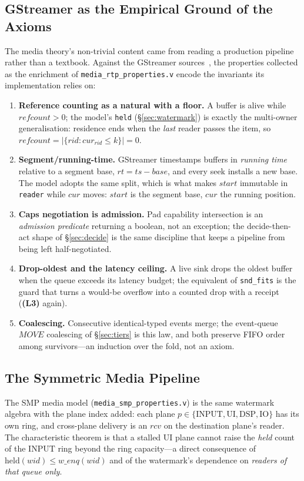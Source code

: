 \documentclass[10pt,journal,compsoc,twocolumn]{article}
\theoremstyle{definition}
\theoremstyle{remark}
\theoremstyle{plain}
\newcommand{\ctr}[1]{\texttt{#1}}
\begin{document}
\subsection{GStreamer as the Empirical Ground of the Axioms}
\label{sec:gst}
The media theory's non-trivial content came from reading a production pipeline rather than a textbook. Against the GStreamer sources~\cite{gst}, the properties collected as the enrichment of \ctr{media\_rtp\_properties.v} encode the invariants its implementation relies on:
\begin{enumerate}[leftmargin=*]
    \item \textbf{Reference counting as a natural with a floor.} A buffer is alive while \(\mathit{refcount} > 0\); the model's \ctr{held} (\S\ref{sec:watermark}) is exactly the multi-owner generalisation: residence ends when the \emph{last} reader passes the item, so \(\mathit{refcount} = |\{\mathit{rid} : \mathit{cur}_{\mathit{rid}} \le k\}| = 0\).
    \item \textbf{Segment/running-time.} GStreamer timestamps buffers in \emph{running time} relative to a segment base, \(\mathit{rt} = \mathit{ts} - \mathit{base}\), and every seek installs a new base. The model adopts the same split, which is what makes \(\mathit{start}\) immutable in \ctr{reader} while \(\mathit{cur}\) moves: \(\mathit{start}\) is the segment base, \(\mathit{cur}\) the running position.
    \item \textbf{Caps negotiation is admission.} Pad capability intersection is an \emph{admission predicate} returning a boolean, not an exception; the decide-then-act shape of \S\ref{sec:decide} is the same discipline that keeps a pipeline from being left half-negotiated.
    \item \textbf{Drop-oldest and the latency ceiling.} A live sink drops the oldest buffer when the queue exceeds its latency budget; the equivalent of \ctr{snd\_fits} is the guard that turns a would-be overflow into a counted drop with a receipt (\textbf{(L3)} again).
    \item \textbf{Coalescing.} Consecutive identical-typed events merge; the event-queue \(\mathit{MOVE}\) coalescing of \S\ref{sec:tiers} is this law, and both preserve FIFO order among survivors---an induction over the fold, not an axiom.
\end{enumerate}

\subsection{The Symmetric Media Pipeline}
The SMP media model (\ctr{media\_smp\_properties.v}) is the same watermark algebra with the plane index added: each plane \(p \in \{\mathrm{INPUT}, \mathrm{UI}, \mathrm{DSP}, \mathrm{IO}\}\) has its own ring, and cross-plane delivery is an \(\mathit{rcv}\) on the destination plane's reader. The characteristic theorem is that a stalled \(\mathrm{UI}\) plane cannot raise the \emph{held} count of the \(\mathrm{INPUT}\) ring beyond the ring capacity---a direct consequence of \(\mathrm{held}(\mathit{wid}) \le \mathit{w\_enq}(\mathit{wid})\) and of the watermark's dependence on \emph{readers of that queue only}.
\end{document}
